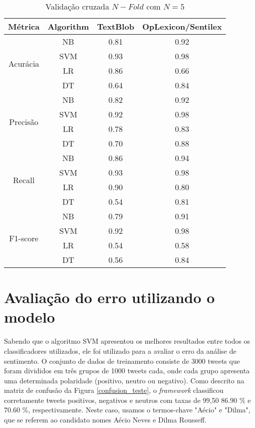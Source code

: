  
 \begin{table}[tbp]
     \centering
     \caption{Validação cruzada $N-Fold$ com $N=5$ }
     \label{tb:fold}
     \begin{tabular}{@{}cccc@{}}
     \toprule  \hline
     Métrica & Algorithm & TextBlob & OpLexicon/Sentilex \\  \hline
     \multirow{4}{*}{Acurácia} & NB & 0.81 & 0.92 \\ 
      & SVM & 0.93 & 0.98 \\ 
      & LR & 0.86 & 0.66 \\ 
      & DT & 0.64 & 0.84  \\  \hline
     \multirow{4}{*}{Precisão} & NB & 0.82 & 0.92 \\ 
      & SVM & 0.92 & 0.98 \\ 
      & LR & 0.78 & 0.83 \\ 
      & DT & 0.70  & 0.88  \\ \hline
     \multirow{4}{*}{Recall} & NB & 0.86 & 0.94 \\ 
      & SVM & 0.93 & 0.98 \\ 
      & LR & 0.90 & 0.80 \\ 
      & DT & 0.54  & 0.81  \\ \hline 
     \multirow{4}{*}{F1-score} & NB & 0.79 & 0.91 \\ 
      & SVM & 0.92 & 0.98 \\ 
      & LR & 0.54 & 0.58 \\
      & DT & 0.56 & 0.84  \\ \hline
     \end{tabular}
     \end{table}
 
 \newpage
 
 \section{Avaliação do erro utilizando o modelo}
 
 Sabendo que o algoritmo \acrshort{SVM} apresentou os melhores resultados entre todos os classificadores utilizados, 
 ele foi utilizado para a avaliar o erro da análise de sentimento. O conjunto de dados de treinamento consiste
 de 3000 tweets que foram divididos em três grupos de
 1000 tweets cada, onde cada grupo apresenta uma determinada polaridade
 (positivo, neutro ou negativo). Como descrito na matriz de confusão da Figura \ref{confusion_teste}, o \textit{framework} classificou corretamente
 tweets positivos, negativos e neutros com taxas de 99,50%
 86.90 \% e 70.60 \%, respectivamente. Neste caso, usamos o
 termos-chave "Aécio" e "Dilma", que se referem ao candidato
 nomes Aécio Neves e Dilma Rousseff.
 
